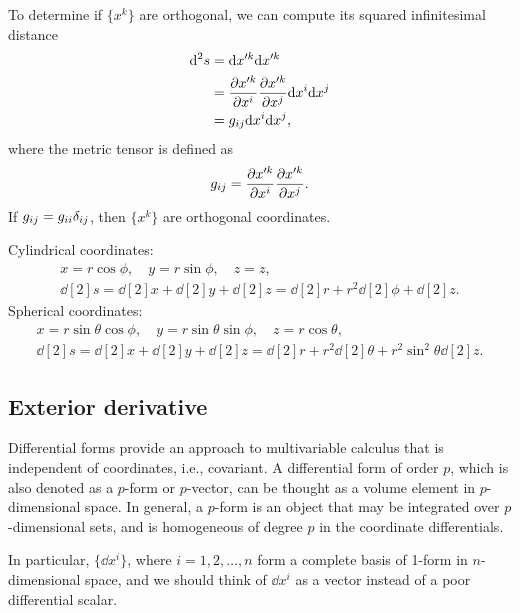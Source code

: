 \documentclass[10pt]{article}
\begin{document}
	To determine if $\{ x^k \}$ are orthogonal, we can compute its squared infinitesimal distance
	\begin{align*}
		\dd[2]{s} &= \dd x'^k \dd x'^k \\
		&= \pdv{x'^k}{x^i} \pdv{x'^k}{x^j} \dd x^i \dd x^j \\
		&= g_{ij} \dd x^i \dd x^j,
	\end{align*}
	where the metric tensor is defined as
	\begin{equation}
		g_{ij} = \pdv{x'^k}{x^i} \pdv{x'^k}{x^j}.
	\end{equation}
	If $g_{ij} = g_{ii} \delta_{ij}$, then $\{ x^k \}$ are orthogonal coordinates.
	\begin{example}
		Cylindrical coordinates:
		\begin{gather}
			x = r \cos \phi, \quad y = r \sin \phi, \quad z = z, \\
			\dd[2]{s} = \dd[2]{x} + \dd[2]{y} + \dd[2]{z} = \dd[2]{r} + r^2 \dd[2]{\phi} + \dd[2]{z}.
		\end{gather}
		Spherical coordinates:
		\begin{gather}
			x = r \sin \theta \cos \phi, \quad y = r \sin \theta \sin \phi, \quad z = r \cos \theta, \\
			\dd[2]{s} = \dd[2]{x} + \dd[2]{y} + \dd[2]{z} = \dd[2]{r} + r^2 \dd[2]{\theta} + r^2 \sin^2{\theta} \dd[2]{z}.
		\end{gather}
	\end{example}
	\subsection{Exterior derivative}

	\begin{definition}
		Differential forms provide an approach to multivariable calculus that is independent of coordinates, i.e., covariant. A differential form of order $p$, which is also denoted as a $p$-form or $p$-vector, can be thought as a volume element in $p$-dimensional space. In general, a $p$-form is an object that may be integrated over $p$-dimensional sets, and is homogeneous of degree $p$ in the coordinate differentials.

		In particular, $\{\dd x^i \}$, where $i = 1, 2, \dots, n$ form a complete basis of 1-form in $n$-dimensional space, and we should think of $\dd x^i$ as a vector instead of a poor differential scalar.
	\end{definition}
\end{document}
